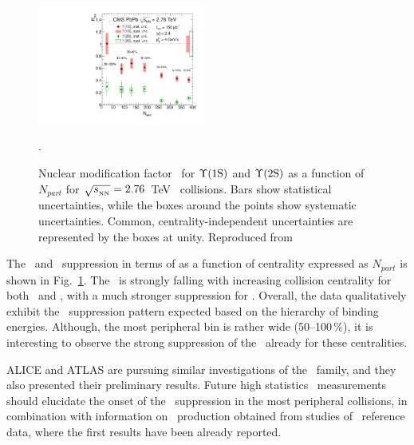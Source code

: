 \begin{figure}[t]
\begin{center}
   \includegraphics[width=0.49\textwidth]{quarkoniafigs/RaaPt4.pdf}
   \label{fig:KS:centrality}
  \caption{
Nuclear modification factor \Raa\ for $\Upsilon\mathrm{(1S)}$ and $\Upsilon\mathrm{(2S)}$ as a function of $N_{part}$ for $\sqrt{s_{_{\rm NN}}} = 2.76$~TeV \PbPb\ collisions. Bars show statistical uncertainties, while the boxes around the points show systematic uncertainties. Common, centrality-independent uncertainties are represented by the boxes at unity. Reproduced from~\cite{Chatrchyan:2012lxa}}.
\end{center}
\end{figure}

The \PgUa\ and \PgUb\ suppression in terms of \Raa as a function of centrality expressed as $N_{part}$
is shown in Fig.~\ref{fig:KS:centrality}.
The \Raa\ is strongly falling with increasing collision centrality
for both \PgUa\ and \PgUb, with a much stronger suppression for \PgUb.
Overall, the data qualitatively exhibit the \PgUn\ suppression pattern
expected based on the hierarchy of binding energies. Although, the most peripheral bin
is rather wide (50--100\,\%), it is interesting to observe the strong suppression of the
\PgUb\ already for these centralities. 

ALICE and ATLAS are pursuing similar investigations of the \PgU\ family, and they also presented their preliminary results.
Future high statistics \PbPb\ measurements
should elucidate the onset of the \PgU\ suppression in the most peripheral collisions,
in combination with information on \PgU\ production obtained from
studies of \pPb\ reference data, where the first results have been already reported.


